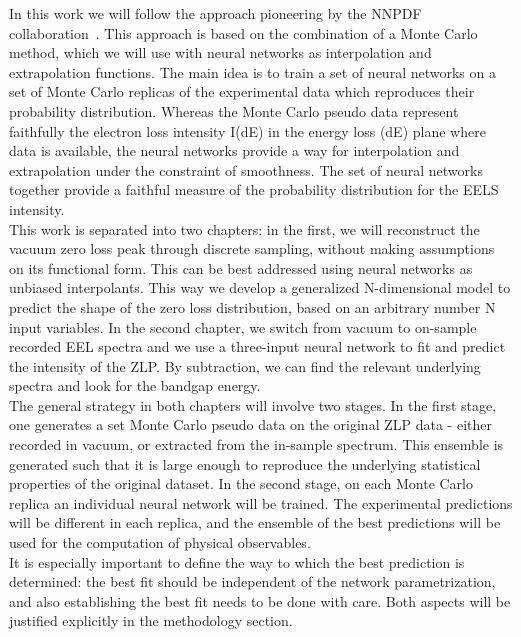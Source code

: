 In this work we will follow the approach pioneering by the NNPDF collaboration~\cite{Ball:2017}. This approach is based on the combination of a Monte Carlo method, which we will use with neural networks as interpolation and extrapolation functions. The main idea is to train a set of neural networks on a set of Monte Carlo replicas of the experimental data which reproduces their probability distribution. Whereas the Monte Carlo pseudo data represent faithfully the electron loss intensity I(dE) in the energy loss (dE) plane where data is available, the neural networks provide a way for interpolation and extrapolation under the constraint of smoothness. The set of neural networks together provide a faithful measure of the probability distribution for the EELS intensity. \\
This work is separated into two chapters: in the first, we will reconstruct the vacuum zero loss peak through discrete sampling, without making assumptions on its functional form. This can be best addressed using neural networks as unbiased interpolants. This way we develop a generalized N-dimensional model to predict the shape of the zero loss distribution, based on an arbitrary number N input variables. 
In the second chapter, we switch from vacuum to on-sample recorded EEL spectra and we use a three-input neural network to fit and predict the intensity of the ZLP. By subtraction, we can find the relevant underlying spectra and look for the bandgap energy.\\
The general strategy in both chapters will involve two stages. In the first stage, one generates a set Monte Carlo pseudo data on the original ZLP data - either recorded in vacuum, or extracted from the in-sample spectrum. This ensemble is generated such that it is large enough to reproduce the underlying statistical properties of the original dataset. In the second stage, on each Monte Carlo replica an individual neural network will be trained. The experimental predictions will be different in each replica, and the ensemble of the best predictions will be used for the computation of physical observables.\\
It is especially important to define the way to which the best prediction is determined: the best fit should be independent of the network parametrization, and also establishing the best fit needs to be done with care. Both aspects will be justified explicitly in the methodology section. \\

